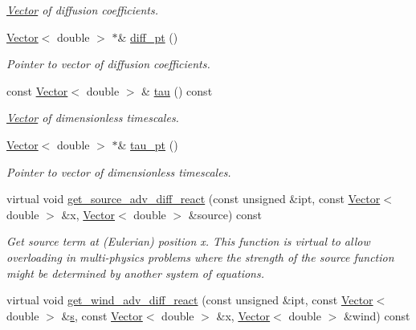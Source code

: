 \begin{DoxyCompactItemize}
\begin{DoxyCompactList}\small\item\em \hyperlink{classoomph_1_1Vector}{Vector} of diffusion coefficients. \end{DoxyCompactList}\item 
\hyperlink{classoomph_1_1Vector}{Vector}$<$ double $>$ $\ast$\& \hyperlink{classoomph_1_1AdvectionDiffusionReactionEquations_a70db4dae4524ac4c2d6af262c4e4d47e}{diff\+\_\+pt} ()
\begin{DoxyCompactList}\small\item\em Pointer to vector of diffusion coefficients. \end{DoxyCompactList}\item 
const \hyperlink{classoomph_1_1Vector}{Vector}$<$ double $>$ \& \hyperlink{classoomph_1_1AdvectionDiffusionReactionEquations_a8976ed911125695578edfa5c2c23755b}{tau} () const
\begin{DoxyCompactList}\small\item\em \hyperlink{classoomph_1_1Vector}{Vector} of dimensionless timescales. \end{DoxyCompactList}\item 
\hyperlink{classoomph_1_1Vector}{Vector}$<$ double $>$ $\ast$\& \hyperlink{classoomph_1_1AdvectionDiffusionReactionEquations_ac3e7834f33607cc560e7a1dd08eb9b7a}{tau\+\_\+pt} ()
\begin{DoxyCompactList}\small\item\em Pointer to vector of dimensionless timescales. \end{DoxyCompactList}\item 
virtual void \hyperlink{classoomph_1_1AdvectionDiffusionReactionEquations_a2a279f4485b7a46a8684cda2678ae825}{get\+\_\+source\+\_\+adv\+\_\+diff\+\_\+react} (const unsigned \&ipt, const \hyperlink{classoomph_1_1Vector}{Vector}$<$ double $>$ \&x, \hyperlink{classoomph_1_1Vector}{Vector}$<$ double $>$ \&source) const
\begin{DoxyCompactList}\small\item\em Get source term at (Eulerian) position x. This function is virtual to allow overloading in multi-\/physics problems where the strength of the source function might be determined by another system of equations. \end{DoxyCompactList}\item 
virtual void \hyperlink{classoomph_1_1AdvectionDiffusionReactionEquations_a2f4bc51e9f535f951f6b1d5827ee3264}{get\+\_\+wind\+\_\+adv\+\_\+diff\+\_\+react} (const unsigned \&ipt, const \hyperlink{classoomph_1_1Vector}{Vector}$<$ double $>$ \&\hyperlink{cfortran_8h_ab7123126e4885ef647dd9c6e3807a21c}{s}, const \hyperlink{classoomph_1_1Vector}{Vector}$<$ double $>$ \&x, \hyperlink{classoomph_1_1Vector}{Vector}$<$ double $>$ \&wind) const

\end{DoxyCompactItemize}
